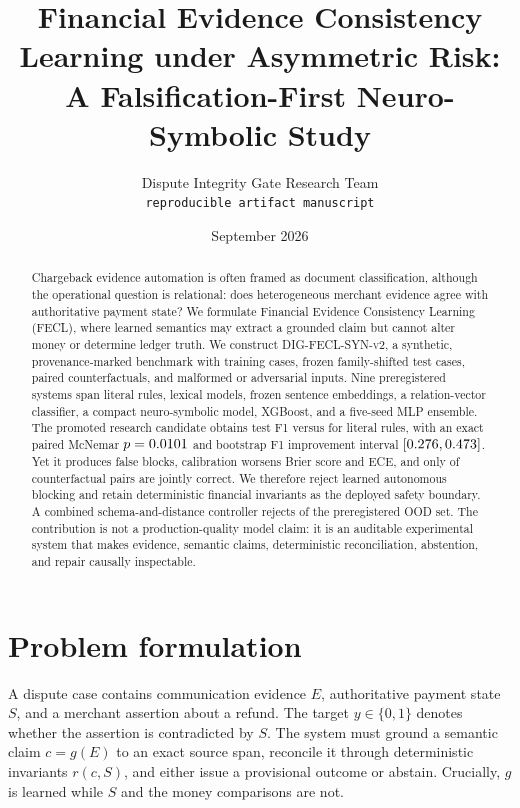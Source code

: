 \documentclass[10pt,twocolumn]{article}
\title{Financial Evidence Consistency Learning under Asymmetric Risk:\\A Falsification-First Neuro-Symbolic Study}
\author{Dispute Integrity Gate Research Team\\\texttt{reproducible artifact manuscript}}
\date{September 2026}
\newcommand{\dataset}{\textsc{DIG-FECL-SYN-v2}}
\begin{document}
\maketitle

\begin{abstract}
Chargeback evidence automation is often framed as document classification, although the operational question is relational: does heterogeneous merchant evidence agree with authoritative payment state? We formulate Financial Evidence Consistency Learning (FECL), where learned semantics may extract a grounded claim but cannot alter money or determine ledger truth. We construct \dataset, a synthetic, provenance-marked benchmark with \TrainCases{} training cases, \TestCases{} frozen family-shifted test cases, paired counterfactuals, and \OODCases{} malformed or adversarial inputs. Nine preregistered systems span literal rules, lexical models, frozen sentence embeddings, a relation-vector classifier, a compact neuro-symbolic model, XGBoost, and a five-seed MLP ensemble. The promoted research candidate obtains test F1 \NeuroFOne{} versus \RulesFOne{} for literal rules, with an exact paired McNemar $p=0.0101$ and bootstrap F1 improvement interval $[0.276,0.473]$. Yet it produces \NeuroFalseBlock{} false blocks, calibration worsens Brier score and ECE, and only \PairBothCorrect{} of counterfactual pairs are jointly correct. We therefore reject learned autonomous blocking and retain deterministic financial invariants as the deployed safety boundary. A combined schema-and-distance controller rejects \OODCombined{} of the preregistered OOD set. The contribution is not a production-quality model claim: it is an auditable experimental system that makes evidence, semantic claims, deterministic reconciliation, abstention, and repair causally inspectable.
\end{abstract}

\section{Problem formulation}
A dispute case contains communication evidence $E$, authoritative payment state $S$, and a merchant assertion about a refund. The target $y\in\{0,1\}$ denotes whether the assertion is contradicted by $S$. The system must ground a semantic claim $c=g(E)$ to an exact source span, reconcile it through deterministic invariants $r(c,S)$, and either issue a provisional outcome or abstain. Crucially, $g$ is learned while $S$ and the money comparisons are not.
\end{document}
